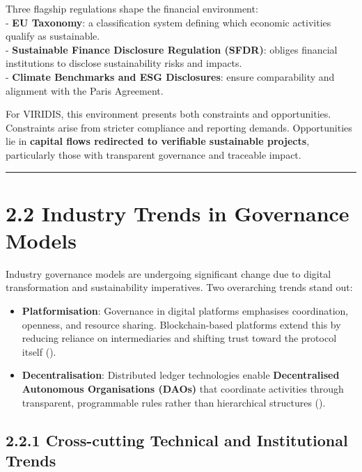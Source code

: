 \documentclass[
  english,
  12pt,
  oneside,
  open=any]{scrbook}
\providecommand{\tightlist}{%
  \setlength{\itemsep}{0pt}\setlength{\parskip}{0pt}}\usepackage{longtable,booktabs,array}
\begin{document}
Three flagship regulations shape the financial environment:\\
- \textbf{EU Taxonomy}: a classification system defining which economic
activities qualify as sustainable.\\
- \textbf{Sustainable Finance Disclosure Regulation (SFDR)}: obliges
financial institutions to disclose sustainability risks and impacts.\\
- \textbf{Climate Benchmarks and ESG Disclosures}: ensure comparability
and alignment with the Paris Agreement.

For VIRIDIS, this environment presents both constraints and
opportunities. Constraints arise from stricter compliance and reporting
demands. Opportunities lie in \textbf{capital flows redirected to
verifiable sustainable projects}, particularly those with transparent
governance and traceable impact.

\begin{center}\rule{0.5\linewidth}{0.5pt}\end{center}

\section{2.2 Industry Trends in Governance Models}\label{sec-trends}

Industry governance models are undergoing significant change due to
digital transformation and sustainability imperatives. Two overarching
trends stand out:

\begin{itemize}
\tightlist
\item
  \textbf{Platformisation}: Governance in digital platforms emphasises
  coordination, openness, and resource sharing. Blockchain-based
  platforms extend this by reducing reliance on intermediaries and
  shifting trust toward the protocol itself
  ().\\
\item
  \textbf{Decentralisation}: Distributed ledger technologies enable
  \textbf{Decentralised Autonomous Organisations (DAOs)} that coordinate
  activities through transparent, programmable rules rather than
  hierarchical structures ().
\end{itemize}

\subsection{2.2.1 Cross-cutting Technical and Institutional
Trends}\label{sec-trends-cross}
\end{document}
